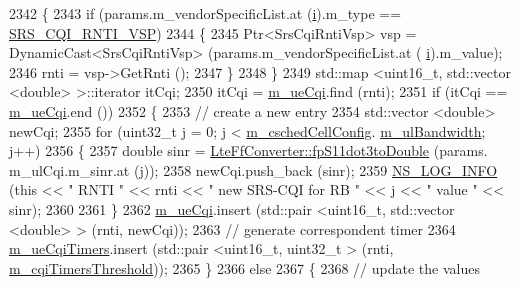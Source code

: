\begin{DoxyCode}
2342           \{
2343             \textcolor{keywordflow}{if} (params.m\_vendorSpecificList.at (\hyperlink{bernuolliDistribution_8m_a6f6ccfcf58b31cb6412107d9d5281426}{i}).m\_type == \hyperlink{lte-vendor-specific-parameters_8h_a3b5e6e766032ab4a8e374a1cfd237a26}{SRS\_CQI\_RNTI\_VSP})
2344               \{
2345                 Ptr<SrsCqiRntiVsp> vsp = DynamicCast<SrsCqiRntiVsp> (params.m\_vendorSpecificList.at (
      \hyperlink{bernuolliDistribution_8m_a6f6ccfcf58b31cb6412107d9d5281426}{i}).m\_value);
2346                 rnti = vsp->GetRnti ();
2347               \}
2348           \}
2349         std::map <uint16\_t, std::vector <double> >::iterator itCqi;
2350         itCqi = \hyperlink{classns3_1_1PssFfMacScheduler_abd1f917911a86bfd576e93ec67d7b8b2}{m\_ueCqi}.find (rnti);
2351         \textcolor{keywordflow}{if} (itCqi == \hyperlink{classns3_1_1PssFfMacScheduler_abd1f917911a86bfd576e93ec67d7b8b2}{m\_ueCqi}.end ())
2352           \{
2353             \textcolor{comment}{// create a new entry}
2354             std::vector <double> newCqi;
2355             \textcolor{keywordflow}{for} (uint32\_t j = 0; j < \hyperlink{classns3_1_1PssFfMacScheduler_a6808e2b2024ed0ced82f80bfe6f0801f}{m\_cschedCellConfig}.
      \hyperlink{structns3_1_1FfMacCschedSapProvider_1_1CschedCellConfigReqParameters_a5ab5b102878e6e7e7727a14af4a64d2f}{m\_ulBandwidth}; j++)
2356               \{
2357                 \textcolor{keywordtype}{double} sinr = \hyperlink{classns3_1_1LteFfConverter_aa5d8c2a8f988dbd63da91818c18666eb}{LteFfConverter::fpS11dot3toDouble} (params.
      m\_ulCqi.m\_sinr.at (j));
2358                 newCqi.push\_back (sinr);
2359                 \hyperlink{group__logging_gafbd73ee2cf9f26b319f49086d8e860fb}{NS\_LOG\_INFO} (\textcolor{keyword}{this} << \textcolor{stringliteral}{" RNTI "} << rnti << \textcolor{stringliteral}{" new SRS-CQI for RB  "} << j << \textcolor{stringliteral}{" value
       "} << sinr);
2360 
2361               \}
2362             \hyperlink{classns3_1_1PssFfMacScheduler_abd1f917911a86bfd576e93ec67d7b8b2}{m\_ueCqi}.insert (std::pair <uint16\_t, std::vector <double> > (rnti, newCqi));
2363             \textcolor{comment}{// generate correspondent timer}
2364             \hyperlink{classns3_1_1PssFfMacScheduler_a1cc9115fabab47bd1c6de8fa20725782}{m\_ueCqiTimers}.insert (std::pair <uint16\_t, uint32\_t > (rnti, 
      \hyperlink{classns3_1_1PssFfMacScheduler_a56d836fa470b6d79eca2b03258325373}{m\_cqiTimersThreshold}));
2365           \}
2366         \textcolor{keywordflow}{else}
2367           \{
2368             \textcolor{comment}{// update the values}

\end{DoxyCode}
